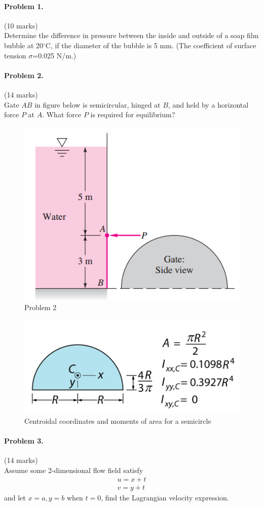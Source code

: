 \documentclass[12pt]{article}
\begin{document}
\newpage
\paragraph{Problem 1.}\hfill (10 marks)\\
Determine the difference in pressure between the inside and outside of a soap film bubble at 20$^\circ\mathrm{C}$, if the diameter of the bubble is 5 mm. (The coefficient of surface tension $\sigma$=0.025 N/m.)

\bigskip
\paragraph{Problem 2.}\hfill (14 marks)\\
Gate $AB$ in figure below is semicircular, hinged at $B$, and held by a horizontal force $P$ at $A$. What force $P$ is required for equilibrium?
\begin{figure}[hb]
	\centering
	\includegraphics[width=0.5\linewidth]{"figs/problem 2B"}
	\caption{Problem 2}
	\label{fig:problem-2}
\end{figure}

\begin{figure}[h]
	\centering
	\includegraphics[width=0.5\linewidth]{"figs/problem 2B hint"}
	\caption{Centroidal coordinates and moments of area for a semicircle}
	\label{fig:problem-2 hint}
\end{figure}



\newpage
\paragraph{Problem 3.}\hfill (14 marks)\\
Assume some 2-dimensional flow field satisfy
\begin{align*}
u=x+t\\
v=y+t
\end{align*}
and let $x=a,y=b$ when $t=0$, find the Lagrangian velocity expression.
\end{document}
